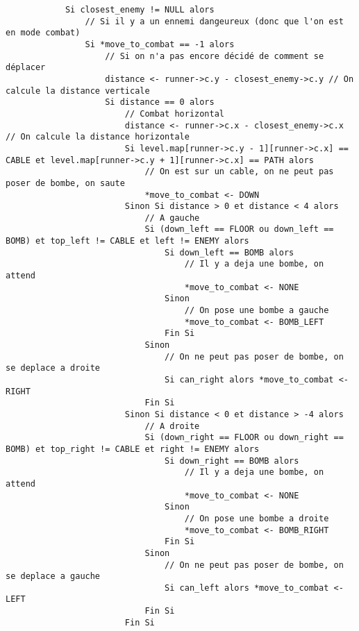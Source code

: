 \begin{longlisting}
\begin{verbatim}
            Si closest_enemy != NULL alors
                // Si il y a un ennemi dangeureux (donc que l'on est en mode combat)
                Si *move_to_combat == -1 alors
                    // Si on n'a pas encore décidé de comment se déplacer
                    distance <- runner->c.y - closest_enemy->c.y // On calcule la distance verticale
                    Si distance == 0 alors
                        // Combat horizontal
                        distance <- runner->c.x - closest_enemy->c.x // On calcule la distance horizontale
                        Si level.map[runner->c.y - 1][runner->c.x] == CABLE et level.map[runner->c.y + 1][runner->c.x] == PATH alors
                            // On est sur un cable, on ne peut pas poser de bombe, on saute
                            *move_to_combat <- DOWN
                        Sinon Si distance > 0 et distance < 4 alors
                            // A gauche
                            Si (down_left == FLOOR ou down_left == BOMB) et top_left != CABLE et left != ENEMY alors
                                Si down_left == BOMB alors
                                    // Il y a deja une bombe, on attend
                                    *move_to_combat <- NONE
                                Sinon
                                    // On pose une bombe a gauche
                                    *move_to_combat <- BOMB_LEFT
                                Fin Si
                            Sinon
                                // On ne peut pas poser de bombe, on se deplace a droite
                                Si can_right alors *move_to_combat <- RIGHT
                            Fin Si
                        Sinon Si distance < 0 et distance > -4 alors
                            // A droite
                            Si (down_right == FLOOR ou down_right == BOMB) et top_right != CABLE et right != ENEMY alors
                                Si down_right == BOMB alors
                                    // Il y a deja une bombe, on attend
                                    *move_to_combat <- NONE
                                Sinon
                                    // On pose une bombe a droite
                                    *move_to_combat <- BOMB_RIGHT
                                Fin Si
                            Sinon
                                // On ne peut pas poser de bombe, on se deplace a gauche
                                Si can_left alors *move_to_combat <- LEFT
                            Fin Si
                        Fin Si


\end{verbatim}
\end{longlisting}
